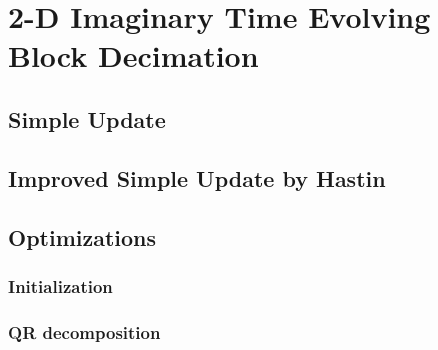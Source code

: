 \chapter{2-D Imaginary Time Evolving Block Decimation}
\label{chapter:2ditebd}

\section{Simple Update}
\label{2dvidal}

\section{Improved Simple Update by Hastin}
\label{2dhastin}

\section{Optimizations}
\label{2dopt}

\subsection{Initialization}
\label{2doptInit}

\subsection{QR decomposition}
\label{2doptQR}
